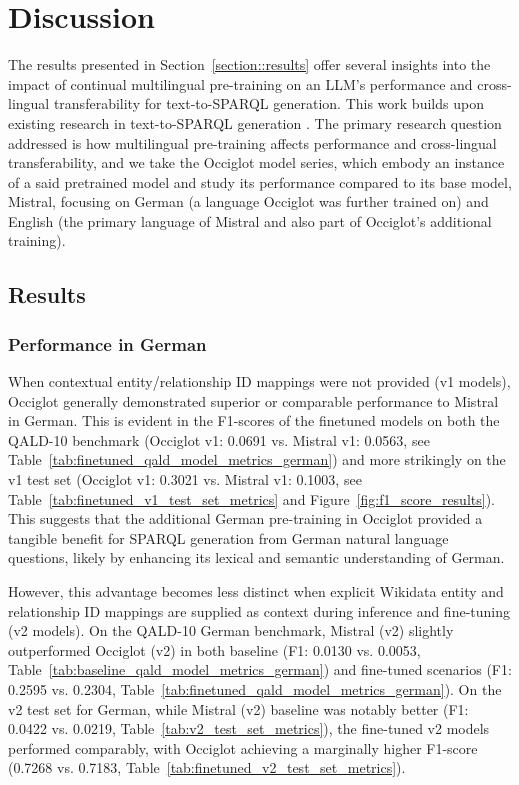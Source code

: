 \section{Discussion}\label{section::discussion}

The results presented in Section~\ref{section::results} offer several insights into the impact of continual multilingual pre-training on an LLM's performance and cross-lingual transferability for text-to-SPARQL generation. 
This work builds upon existing research in text-to-SPARQL generation \cite{avila2024experiments,zahera2024generating,emonet2024llm,LOPEZ20133}. 
The primary research question addressed is how multilingual pre-training affects performance and cross-lingual transferability, and we take the Occiglot model series, which embody an instance of a said pretrained model and study its performance compared to its base model, Mistral, focusing on German (a language Occiglot was further trained on) and English (the primary language of Mistral and also part of Occiglot's additional training).

\subsection{Results}
\subsubsection{Performance in German}

When contextual entity/relationship ID mappings were not provided (v1 models), Occiglot generally demonstrated superior or comparable performance to Mistral in German.
This is evident in the F1-scores of the finetuned models on both the QALD-10 benchmark (Occiglot v1: 0.0691 vs. Mistral v1: 0.0563, see Table~\ref{tab:finetuned_qald_model_metrics_german}) and more strikingly on the v1 test set (Occiglot v1: 0.3021 vs. Mistral v1: 0.1003, see Table~\ref{tab:finetuned_v1_test_set_metrics} and Figure~\ref{fig:f1_score_results}). 
This suggests that the additional German pre-training in Occiglot provided a tangible benefit for SPARQL generation from German natural language questions, likely by enhancing its lexical and semantic understanding of German.

However, this advantage becomes less distinct when explicit Wikidata entity and relationship ID mappings are supplied as context during inference and fine-tuning (v2 models). 
On the QALD-10 German benchmark, Mistral (v2) slightly outperformed Occiglot (v2) in both baseline (F1: 0.0130 vs. 0.0053, Table~\ref{tab:baseline_qald_model_metrics_german}) and fine-tuned scenarios (F1: 0.2595 vs. 0.2304, Table~\ref{tab:finetuned_qald_model_metrics_german}). 
On the v2 test set for German, while Mistral (v2) baseline was notably better (F1: 0.0422 vs. 0.0219, Table~\ref{tab:v2_test_set_metrics}), the fine-tuned v2 models performed comparably, with Occiglot achieving a marginally higher F1-score (0.7268 vs. 0.7183, Table~\ref{tab:finetuned_v2_test_set_metrics}).

